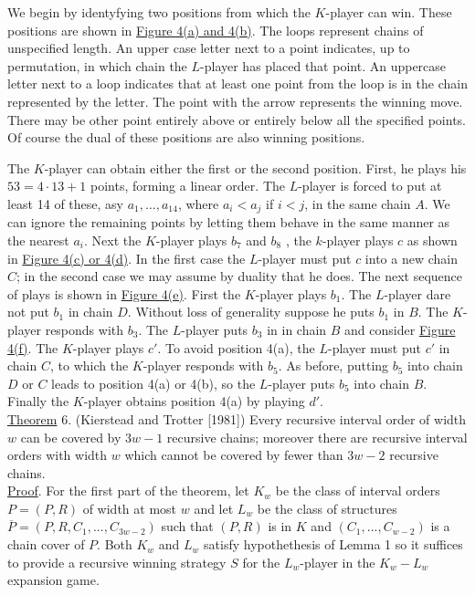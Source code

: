 \documentclass[twoside]{article}
\begin{document}
We begin by identyfying two positions from which the $K$-player can win. These positions are shown in \underline{Figure 4(a) and 4(b)}. The loops
represent chains of unspecified length. An upper case letter next to a point indicates, up to permutation, in which chain the $L$-player has placed
that point. An uppercase letter next to a loop indicates that at least one point from the loop is in the chain represented by the letter. The point 
with the arrow represents the winning move. There may be other point entirely above or entirely below all the specified points. Of course the dual
of these positions are also winning positions.

The $K$-player can obtain either the first or the second position. First, he plays his $53 = 4 \cdot 13 + 1$ points, forming a linear order.
The $L$-player is forced to put at least 14 of these, asy $a_1,...,a_{14}$, where $a_i < a_j$ if $i<j$, in the same chain $A$. We can ignore the
remaining points by letting them behave in the same manner as the nearest $a_i$. Next the $K$-player plays $b_7$ and $b_8$ , the $k$-player plays
$c$ as shown in \underline{Figure 4(c) or 4(d)}. In the first case the $L$-player must put $c$ into a new chain $C$; in the second case
we may assume by duality that he does. The next sequence of plays is shown in \underline{Figure 4(e)}. First the $K$-player plays $b_1$. The
$L$-player dare not put $b_1$ in chain $D$. Without loss of generality suppose he puts $b_1$ in $B$. The $K$-player responds with $b_3$.
The $L$-player puts $b_3$ in in chain $B$ and consider \underline{Figure 4(f)}. The $K$-player plays $c'$. To avoid position 4(a), the $L$-player
must put $c'$ in chain $C$, to which the $K$-player responds with $b_5$. As before, putting $b_5$ into chain $D$ or $C$ leads to position 4(a) or
4(b), so the $L$-player puts $b_5$ into chain $B$. Finally the $K$-player obtains position 4(a) by playing $d'$.\\
%
%
\newline
\underline{Theorem} 6. (Kierstead and Trotter [1981]) Every recursive interval order of width $w$ can be covered by $3w-1$ recursive chains;
moreover there are recursive interval orders with width $w$ which cannot be covered by fewer than $3w-2$ recursive chains.\\
\newline
\underline{Proof}. For the first part of the theorem, let $K_w$ be the class of interval orders $P = (P,R)$ of width at most $w$ and let $L_w$ 
be the class of structures $\overline{P}= (P,R, C_1,...,C_{3w-2})$ such that
$(P,R)$ is in $K$ and $(C_1,...,C_{w-2})$ is a chain cover of $P$. Both $K_w$ and $L_w$
satisfy hypothethesis of Lemma 1 so it suffices to provide a recursive winning strategy
$S$ for the $L_w$-player in the $K_w - L_w$ expansion game.
\end{document}
